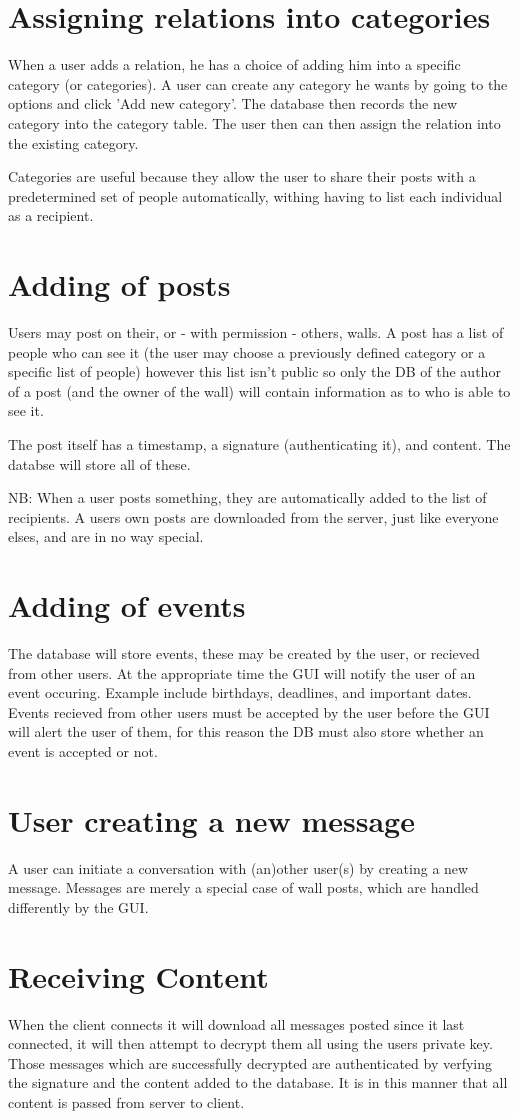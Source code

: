 \section{Assigning relations into categories}
When a user adds a relation, he has a choice of adding him into a specific
category (or categories). A user can create any category he wants by going to
the options and click 'Add new category'. The database then records the new
category into the category table.  The user then can then assign the relation
into the existing category.

Categories are useful because they allow the user to share their posts with a
predetermined set of people automatically, withing having to list each
individual as a recipient.

\section{Adding of posts}
Users may post on their, or - with permission - others, walls. A post has a list
of people who can see it (the user may choose a previously defined category or
a specific list of people) however this list isn't public so only the DB of the
author of a post (and the owner of the wall) will contain information as to who
is able to see it.

The post itself has a timestamp, a signature (authenticating it), and content.
The databse will store all of these.

NB: When a user posts something, they are automatically added to the list of
recipients. A users own posts are downloaded from the server, just like everyone
elses, and are in no way special.

\section{Adding of events}
The database will store events, these may be created by the user, or recieved
from other users. At the appropriate time the GUI will notify the user of an
event occuring. Example include birthdays, deadlines, and important dates.
Events recieved from other users must be accepted by the user before the GUI
will alert the user of them, for this reason the DB must also store whether an
event is accepted or not.

\section{User creating a new message}
A user can initiate a conversation with (an)other user(s) by creating a new
message. Messages are merely a special case of wall posts, which are handled
differently by the GUI.

\section{Receiving Content}
When the client connects it will download all messages posted since it last
connected, it will then attempt to decrypt them all using the users private key.
Those messages which are successfully decrypted are authenticated by verfying
the signature and the content added to the database. It is in this manner that
all content is passed from server to client.
